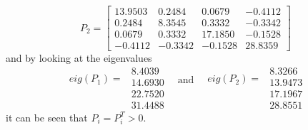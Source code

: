 \begin{equation}
    P_2 = \begin{bmatrix}
    13.9503 & 0.2484 & 0.0679 &  -0.4112\\
    0.2484 & 8.3545 & 0.3332 & -0.3342 \\
    0.0679 & 0.3332 & 17.1850 & -0.1528\\
    -0.4112 & -0.3342 & -0.1528 & 28.8359
    \end{bmatrix}
    \label{eq:ex1d_P2}
\end{equation}
and by looking at the eigenvalues
\begin{equation}
   \begin{matrix} eig(P_1)  =\\ \\ \\ \\ \end{matrix} \begin{matrix} 8.4039 \\ 14.6930 \\ 22.7520 \\ 31.4488 \end{matrix} \; \; \begin{matrix} \text{and}\\ \\ \\ \\ \end{matrix} \; \; 
    \begin{matrix} eig(P_2) =\\ \\ \\ \\\end{matrix}\begin{matrix} 8.3266 \\ 13.9473 \\ 17.1967 \\ 28.8551 \end{matrix}
    \label{eq:ex1d_eigP}
\end{equation}
it can be seen that $P_i = P_i^T> 0$.